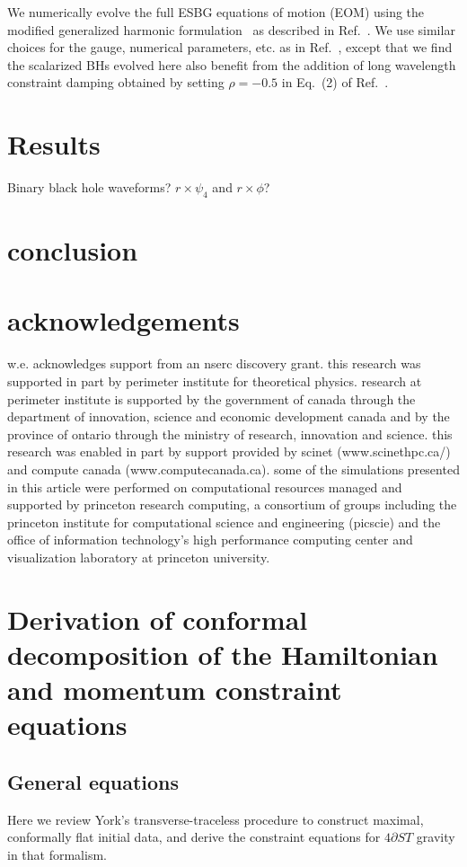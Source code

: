 \documentclass[%
notitlepage,
report,
nofootinbib,
 amsmath,amssymb,
 aps,
]{revtex4-1}
\newcommand{\ssec}[1]{\section{#1}}
\begin{document}
We numerically evolve the full ESBG equations of motion (EOM)
using the modified generalized harmonic
formulation~\cite{Kovacs:2020pns,Kovacs:2020ywu}
as described in Ref.~\cite{East:2020hgw}.
We use similar choices for the gauge, numerical parameters, etc. as in
Ref.~\cite{East:2020hgw},
except that we find the scalarized BHs evolved here also benefit from 
the addition of long wavelength constraint damping obtained by setting
$\rho=-0.5$ in Eq.~(2) of Ref.~\cite{East:2020hgw}.
\ssec{Results}
   Binary black hole waveforms? $r\times\psi_4$ and $r\times\phi$?
\ssec{conclusion}%

\ssec{acknowledgements}%
w.e. acknowledges support from an nserc discovery grant.
this research was
supported in part by perimeter institute for theoretical physics.  research at
perimeter institute is supported by the government of canada through the
department of innovation, science and economic development canada and by the
province of ontario through the ministry of research, innovation and science.
this research was enabled in part by support provided by scinet
(www.scinethpc.ca/) and compute canada (www.computecanada.ca).
some of the simulations presented in this article were performed on
computational resources managed and supported by princeton research computing,
a consortium of groups including the princeton institute for
computational science and engineering (picscie)
and the office of information technology's high performance
computing center and visualization laboratory at princeton university.




\appendix
\section{Derivation of conformal decomposition of the Hamiltonian
and momentum constraint equations}
\label{eq:conformal_decomp_derivation}
\subsection{General equations}
\label{eq:general_id_eqns}

   Here we review York's transverse-traceless procedure to construct
maximal, conformally flat initial data, and derive the constraint
equations for $4\partial ST$ gravity in that formalism.
\end{document}
